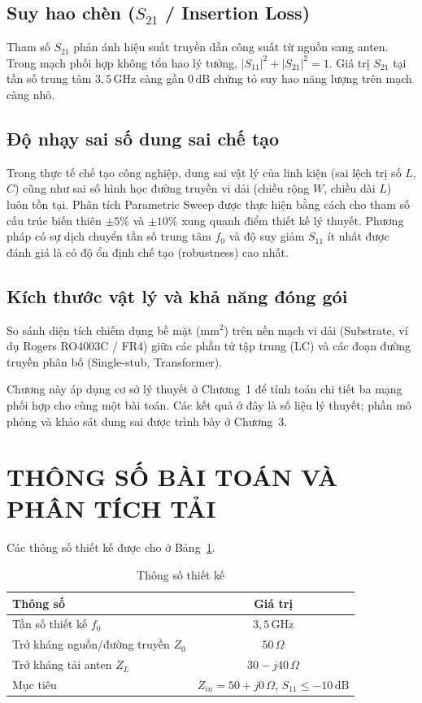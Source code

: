 \documentclass[a4paper]{report}
\newcommand\Zo{Z_0}
\newcommand\ZL{Z_L}
\newcommand\dB{\,\mathrm{dB}}
\newcommand\GHz{\,\mathrm{GHz}}
\begin{document}
\subsection{Suy hao chèn ($S_{21}$ / Insertion Loss)}
Tham số $S_{21}$ phản ánh hiệu suất truyền dẫn công suất từ nguồn sang anten. Trong mạch phối hợp không tổn hao lý tưởng, $|S_{11}|^2+|S_{21}|^2=1$. Giá trị $S_{21}$ tại tần số trung tâm $3{,}5\GHz$ càng gần $0\dB$ chứng tỏ suy hao năng lượng trên mạch càng nhỏ.

\subsection{Độ nhạy sai số dung sai chế tạo}
Trong thực tế chế tạo công nghiệp, dung sai vật lý của linh kiện (sai lệch trị số $L$, $C$) cũng như sai số hình học đường truyền vi dải (chiều rộng $W$, chiều dài $L$) luôn tồn tại. Phân tích Parametric Sweep được thực hiện bằng cách cho tham số cấu trúc biến thiên $\pm5\%$ và $\pm10\%$ xung quanh điểm thiết kế lý thuyết. Phương pháp có sự dịch chuyển tần số trung tâm $f_0$ và độ suy giảm $S_{11}$ ít nhất được đánh giá là có độ ổn định chế tạo (robustness) cao nhất.

\subsection{Kích thước vật lý và khả năng đóng gói}
So sánh diện tích chiếm dụng bề mặt ($\mathrm{mm}^2$) trên nền mạch vi dải (Substrate, ví dụ Rogers RO4003C / FR4) giữa các phần tử tập trung (LC) và các đoạn đường truyền phân bố (Single-stub, Transformer).


Chương này áp dụng cơ sở lý thuyết ở Chương~1 để tính toán chi tiết ba mạng phối hợp cho cùng một bài toán. Các kết quả ở đây là số liệu lý thuyết; phần mô phỏng và khảo sát dung sai được trình bày ở Chương~3.

\section{THÔNG SỐ BÀI TOÁN VÀ PHÂN TÍCH TẢI}

Các thông số thiết kế được cho ở Bảng~\ref{tab:thongso}.

\begin{table}[H]
\caption{Thông số thiết kế}\label{tab:thongso}
\centering
\begin{tabular}{|l|c|}
\hline
\textbf{Thông số} & \textbf{Giá trị} \\ \hline
Tần số thiết kế $f_0$ & $3{,}5\GHz$ \\ \hline
Trở kháng nguồn/đường truyền $\Zo$ & $50\,\Omega$ \\ \hline
Trở kháng tải anten $\ZL$ & $30-j40\,\Omega$ \\ \hline
Mục tiêu & $Z_{in}=50+j0\,\Omega$, $S_{11}\le-10\dB$ \\ \hline
\end{tabular}
\end{table}
\end{document}
